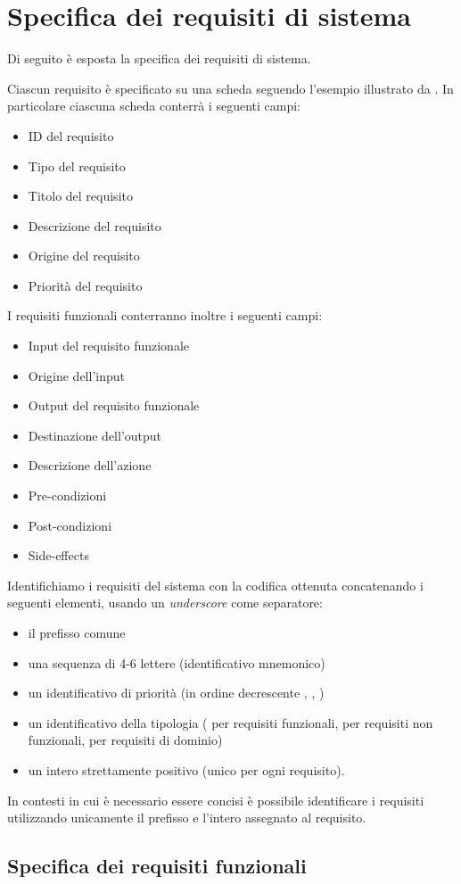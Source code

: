 
\section{Specifica dei requisiti di sistema}

Di seguito \`e esposta la specifica dei requisiti di sistema.

Ciascun requisito \`e specificato su una scheda seguendo l'esempio illustrato da \cite[p. 97]{sommerville}.
In particolare ciascuna scheda conterr\`a i seguenti campi:
\begin{itemize}
	\item ID del requisito
	\item Tipo del requisito
	\item Titolo del requisito
	\item Descrizione del requisito
	\item Origine del requisito
	\item Priorit\`a del requisito
\end{itemize}
I requisiti funzionali conterranno inoltre i seguenti campi:
\begin{itemize}
	\item Input del requisito funzionale
	\item Origine dell'input
	\item Output del requisito funzionale
	\item Destinazione dell'output
	\item Descrizione dell'azione
	\item Pre-condizioni
	\item Post-condizioni
	\item Side-effects
\end{itemize}

Identifichiamo i requisiti del sistema con la codifica ottenuta concatenando i seguenti elementi, usando un \emph{underscore} come separatore:
\begin{itemize}
	\item il prefisso comune 
	\item una sequenza di 4-6 lettere (identificativo mnemonico)
	\item un identificativo di priorit\`a (in ordine decrescente , , )
	\item un identificativo della tipologia ( per requisiti funzionali,  per requisiti non funzionali,  per requisiti di dominio)
	\item un intero strettamente positivo (unico per ogni requisito).
\end{itemize}
In contesti in cui \`e necessario essere concisi \`e possibile identificare i requisiti utilizzando unicamente il prefisso  e l'intero assegnato al requisito.

\subsection{Specifica dei requisiti funzionali}



